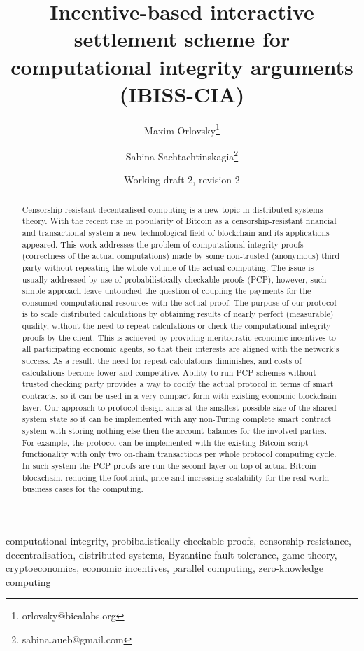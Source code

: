\documentclass[conference]{IEEEtran}
\title{Incentive-based interactive settlement scheme for computational integrity arguments (IBISS-CIA)}
\author[1,2]{Maxim Orlovsky\thanks{orlovsky@bicalabs.org}}
\author[1,3]{Sabina Sachtachtinskagia\thanks{sabina.aueb@gmail.com}}
\affil[1]{Pandora Core AG, Switzerland}
\affil[2]{BICA Labs, Switzerland}
\affil[3]{Athens University of Economics and Business, Greece}
\date{Working draft 2, revision 2}
\begin{document}
\maketitle

\begin{abstract}
Censorship resistant decentralised computing is a new topic in distributed systems theory. With the recent rise in popularity of Bitcoin as a censorship-resistant financial and transactional system a new technological field of blockchain and its applications appeared. This work addresses the problem of computational integrity proofs (correctness of the actual computations) made by some non-trusted (anonymous) third party without repeating the whole volume of the actual computing. The issue is usually addressed by use of probabilistically checkable proofs (PCP), however, such simple approach leave untouched the question of coupling the payments for the consumed computational resources with the actual proof. The purpose of our protocol is to scale distributed calculations by obtaining results of nearly perfect (measurable) quality, without the need to repeat calculations or check the computational integrity proofs by the client. This is achieved by providing meritocratic economic incentives to all participating economic agents, so that their interests are aligned with the network's success. As a result, the need for repeat calculations diminishes, and costs of calculations become lower and competitive. Ability to run PCP schemes without trusted checking party provides a way to codify the actual protocol in terms of smart contracts, so it can be used in a very compact form with existing economic blockchain layer. Our approach to protocol design aims at the smallest possible size of the shared system state so it can be implemented with any non-Turing complete smart contract system with storing nothing else then the account balances for the involved parties. For example, the protocol can be implemented with the existing Bitcoin script functionality with only two on-chain transactions per whole protocol computing cycle. In such system the PCP proofs are run the second layer on top of actual Bitcoin blockchain, reducing the footprint, price and increasing scalability for the real-world business cases for the computing.
\end{abstract}

\begin{IEEEkeywords}
computational integrity, probibalistically checkable proofs, censorship resistance, decentralisation, distributed systems, Byzantine fault tolerance, game theory, cryptoeconomics, economic incentives, parallel computing, zero-knowledge computing
\end{IEEEkeywords}
\end{document}
